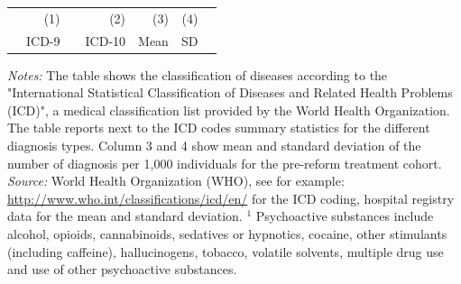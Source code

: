 \documentclass[11pt, a4paper]{article} %
\begin{document}
\begin{landscape}
\begin{table}[h]
\begin{threeparttable}
			\begin{tabular}{lrrrrrr} %
				\toprule %
				&\multicolumn{1}{r}{(1)}& &\multicolumn{1}{r}{(2)}&\multicolumn{1}{r}{(3)} &\multicolumn{1}{r}{(4)}\\
				&\multicolumn{1}{r}{ICD-9} & & \multicolumn{1}{r}{ICD-10}&\multicolumn{1}{r}{Mean}&\multicolumn{1}{r}{SD} \\ 
				\midrule
				
				\bottomrule %
			\end{tabular}
			\begin{tablenotes}
				\scriptsize{ \item \textit{Notes:} The table shows the classification of diseases according to the "International Statistical Classification of Diseases and Related Health Problems (ICD)", a medical classification list provided by the World Health Organization.  The table reports next to the ICD codes summary statistics for the different diagnosis types. Column 3 and 4 show mean and standard deviation of the number of diagnosis per 1,000 individuals for the pre-reform treatment cohort. \newline \textit{Source:} World Health Organization (WHO), see for example: \href{http://www.who.int/classifications/icd/en/}{http://www.who.int/classifications/icd/en/} for the ICD coding, hospital registry data for the mean and standard deviation. \newline\hspace*{15 pt}$^1$ Psychoactive substances include alcohol, opioids, cannabinoids, sedatives or hypnotics, cocaine, other stimulants (including caffeine), hallucinogens, tobacco, volatile solvents,  multiple drug use and use of other psychoactive substances. }
			\end{tablenotes}
		\end{threeparttable}
	\end{table}
	\vspace*{\fill}\clearpage 
\end{landscape}
\restoregeometry
 \vspace*{\fill}
\end{document}
